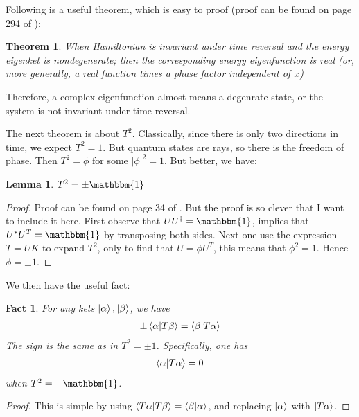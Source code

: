 \documentclass{article}
\numberwithin{equation}{subsection} %
\newtheorem{thm}{Theorem}[section]
\newtheorem{lemma}{Lemma}[section]
\newtheorem{fact}{Fact}[section]
\theoremstyle{definition}
\begin{document}
    Following is a useful theorem, which is easy to proof (proof can be
    found on page 294 of \cite{sakurai}):
    \begin{thm}
        \label{thm:TRoper.fromCM2QM.TR_nondegen_real}
        When Hamiltonian is invariant under time reversal and the energy
        eigenket is nondegenerate; then the corresponding energy
        eigenfunction is real (or, more generally, a real function times a
        phase factor independent of $x$)
    \end{thm}
    Therefore, a complex eigenfunction almost means a degenrate state, or
    the system is not invariant under time reversal.
    
    The next theorem is about $T^2$. Classically, since there is only
    two directions in time, we expect $T^2=1$. But quantum states are
    rays, so there is the freedom of phase. Then $T^2 = \phi$ for
    some $|\phi|^2=1$. But better, we have:
    
    \begin{lemma}
        $T^2 = \pm \mathbbm{1}$
    \end{lemma}
    \begin{proof}
        Proof can be found on page 34 of \cite{bernevig}. But the proof is
        so clever that I want to include it here. First observe that 
        $U U^\dagger = \mathbbm{1}$, implies that $U^* U^T = \mathbbm{1}$
        by transposing both sides. Next one use the expression $T=UK$ to
        expand $T^2$, only to find that $U=\phi U^T$, this means that
        $\phi^2=1$. Hence $\phi=\pm 1$.
    \end{proof}

    We then have the useful fact:
    \begin{fact}
        For any kets $\ket{\alpha},\ket{\beta}$, we have
        \begin{align}
            \pm \braket{\alpha|T\beta} = 
                \braket{\beta|T\alpha}
        \end{align}
        The sign is the same as in $T^2=\pm 1$. Specifically, one has
        \begin{align}
            \braket{\alpha |T \alpha} = 0
        \end{align}
        when $T^2= -\mathbbm{1}$.
    \end{fact}
    \begin{proof}
        This is simple by using 
        $\braket{T\alpha|T\beta} = \braket{\beta|\alpha}$, 
        and replacing $\ket{\alpha}$ with $\ket{T \alpha}$.
    \end{proof}
\end{document}
